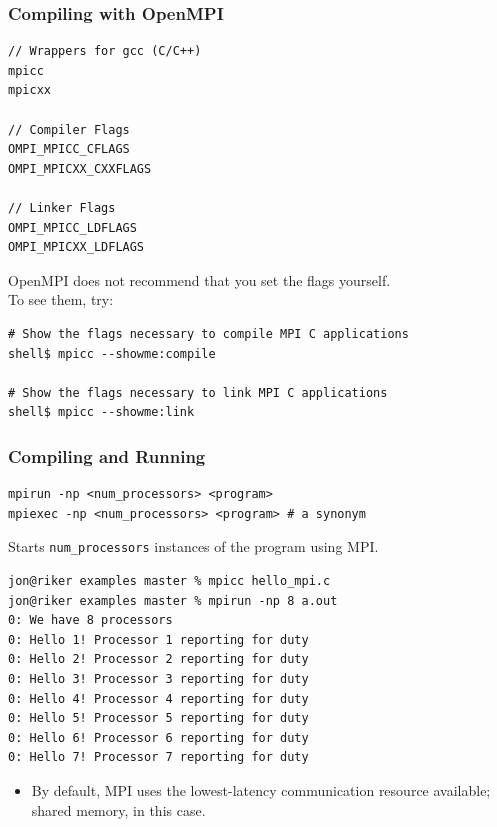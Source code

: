 \begin{frame}[fragile]
  \frametitle{Compiling with OpenMPI}
  

  \begin{lstlisting}
// Wrappers for gcc (C/C++)
mpicc
mpicxx

// Compiler Flags
OMPI_MPICC_CFLAGS
OMPI_MPICXX_CXXFLAGS

// Linker Flags
OMPI_MPICC_LDFLAGS
OMPI_MPICXX_LDFLAGS
  \end{lstlisting}

OpenMPI does not recommend that you set the flags yourself. \\ To see them, try:

  \begin{lstlisting}
# Show the flags necessary to compile MPI C applications
shell$ mpicc --showme:compile

# Show the flags necessary to link MPI C applications
shell$ mpicc --showme:link
  \end{lstlisting}
  
\end{frame}

\begin{frame}[fragile]
  \frametitle{Compiling and Running}



  \begin{lstlisting}
mpirun -np <num_processors> <program>
mpiexec -np <num_processors> <program> # a synonym
  \end{lstlisting}

  
   Starts {\tt num\_processors} instances of the program using MPI.

  \begin{lstlisting}
jon@riker examples master % mpicc hello_mpi.c 
jon@riker examples master % mpirun -np 8 a.out
0: We have 8 processors
0: Hello 1! Processor 1 reporting for duty
0: Hello 2! Processor 2 reporting for duty
0: Hello 3! Processor 3 reporting for duty
0: Hello 4! Processor 4 reporting for duty
0: Hello 5! Processor 5 reporting for duty
0: Hello 6! Processor 6 reporting for duty
0: Hello 7! Processor 7 reporting for duty
  \end{lstlisting}

  \begin{itemize}
    \item By default, MPI uses the lowest-latency communication resource available; shared 
      memory, in this case.
  \end{itemize}
  
\end{frame}


